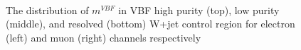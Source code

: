 \begin{figure}[ht]
    \\   
	\caption{The distribution of $m^{VBF}$ in VBF high purity (top), low purity (middle), and resolved (bottom) W+jet control region for electron (left) and muon (right) channels respectively}
	\label{Fig:mJJVBFWR}
\end{figure}



